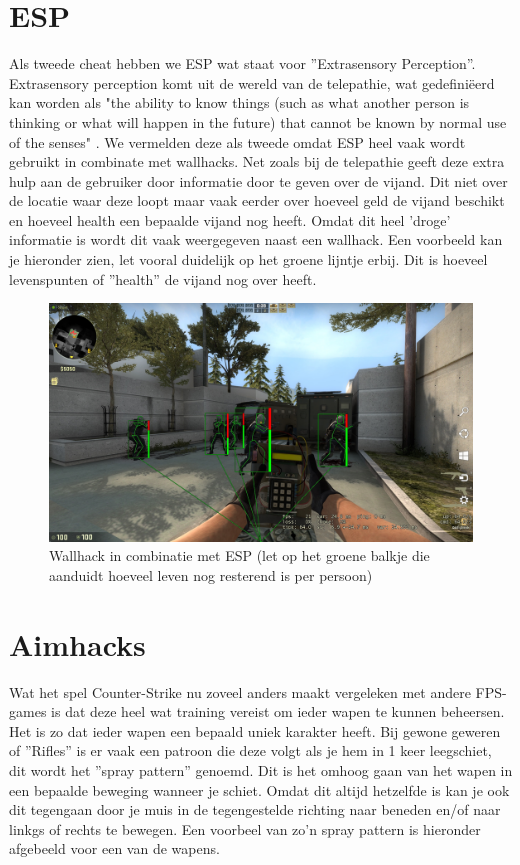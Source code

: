 \documentclass[pdftex,a4paper,12pt,twoside]{report}
\begin{document}
\section{ESP}
\label{ESP}
Als tweede cheat hebben we ESP wat staat voor ''Extrasensory Perception''. Extrasensory perception komt uit de wereld van de telepathie, wat gedefiniëerd kan worden als "the ability to know things (such as what another person is thinking or what will happen in the future) that cannot be known by normal use of the senses" \citep{extrasensoryperception}. We vermelden deze als tweede omdat ESP heel vaak wordt gebruikt in combinate met wallhacks. Net zoals bij de telepathie geeft deze extra hulp aan de gebruiker door informatie door te geven over de vijand. Dit niet over de locatie waar deze loopt maar vaak eerder over hoeveel geld de vijand beschikt en hoeveel health een bepaalde vijand nog heeft.
Omdat dit heel 'droge' informatie is wordt dit vaak weergegeven naast een wallhack. Een voorbeeld kan je hieronder zien, let vooral duidelijk op het groene lijntje erbij. Dit is hoeveel levenspunten of ''health'' de vijand nog over heeft.
\begin{figure}[!hb]
\centering
\includegraphics[width=15cm]{img/esp-example}
\caption{Wallhack in combinatie met ESP (let op het groene balkje die aanduidt hoeveel leven nog resterend is per persoon)}
\end{figure}
  
\section{Aimhacks}
\label{sec:aim}
Wat het spel Counter-Strike nu zoveel anders maakt vergeleken met andere FPS-games is dat deze heel wat training vereist om ieder wapen te kunnen beheersen. Het is zo dat ieder wapen een bepaald uniek karakter heeft. Bij gewone geweren of ''Rifles'' is er vaak een patroon die deze volgt als je hem in 1 keer leegschiet, dit wordt het ''spray pattern'' genoemd. Dit is het omhoog gaan van het wapen in een bepaalde beweging wanneer je schiet. Omdat dit altijd hetzelfde is kan je ook dit tegengaan door je muis in de tegengestelde richting naar beneden en/of naar linkgs of rechts te bewegen. Een voorbeel van zo'n spray pattern is hieronder afgebeeld voor een van de wapens.
\end{document}
